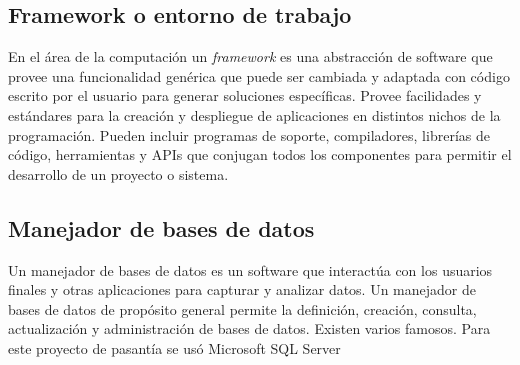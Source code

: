 \subsection{Framework o entorno de trabajo} 

En el área de la computación un \emph{framework} es una abstracción de software que provee una funcionalidad genérica que puede ser cambiada y adaptada con código escrito por el usuario para generar soluciones específicas. Provee facilidades y estándares para la creación y despliegue de aplicaciones en distintos nichos de la programación. Pueden incluir programas de soporte, compiladores, librerías de código, herramientas y APIs que conjugan todos los componentes para permitir el desarrollo de un proyecto o sistema.

\subsection{Manejador de bases de datos} 

Un manejador de bases de datos es un software que interactúa con los usuarios finales y otras aplicaciones para capturar y analizar datos. Un manejador de bases de datos de propósito general permite la definición, creación, consulta, actualización y administración de bases de datos. Existen varios famosos. Para este proyecto de pasantía se usó Microsoft SQL Server